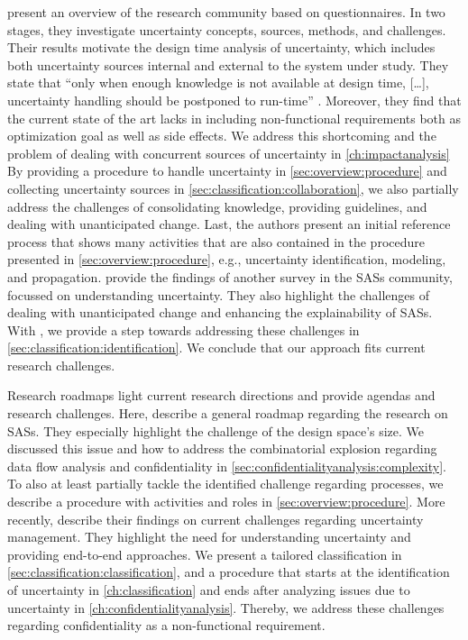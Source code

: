 \textcite{hezavehi_uncertainty_2021} present an overview of the research community based on questionnaires.
In two stages, they investigate uncertainty concepts, sources, methods, and challenges.
Their results motivate the design time analysis of uncertainty, which includes both uncertainty sources internal and external to the system under study.
They state that \enquote{only when enough knowledge is not available at design time, [\dots], uncertainty handling should be postponed to run-time} \cite{hezavehi_uncertainty_2021}.
Moreover, they find that the current state of the art lacks in including non-functional requirements both as optimization goal as well as side effects.
We address this shortcoming and the problem of dealing with concurrent sources of uncertainty in \autoref{ch:impactanalysis}
By providing a procedure to handle uncertainty in \autoref{sec:overview:procedure} and collecting uncertainty sources in \autoref{sec:classification:collaboration}, we also partially address the challenges of consolidating knowledge, providing guidelines, and dealing with unanticipated change.
Last, the authors present an initial reference process that shows many activities that are also contained in the procedure presented in \autoref{sec:overview:procedure}, e.g., uncertainty identification, modeling, and propagation.
\textcite{calinescu_understanding_2020} provide the findings of another survey in the \acp{SAS} community, focussed on understanding uncertainty.
They also highlight the challenges of dealing with unanticipated change and enhancing the explainability of \acp{SAS}.
With \arcen, we provide a step towards addressing these challenges in \autoref{sec:classification:identification}.
We conclude that our approach fits current research challenges.

Research roadmaps light current research directions and provide agendas and research challenges.
Here, \textcite{de_lemos_software_2013} describe a general roadmap regarding the research on \acp{SAS}.
They especially highlight the challenge of the design space's size.
We discussed this issue and how to address the combinatorial explosion regarding data flow analysis and confidentiality in \autoref{sec:confidentialityanalysis:complexity}.
To also at least partially tackle the identified challenge regarding processes, we describe a procedure with activities and roles in \autoref{sec:overview:procedure}.
More recently, \textcite{weyns_towards_2023} describe their findings on current challenges regarding uncertainty management.
They highlight the need for understanding uncertainty and providing end-to-end approaches.
We present a tailored classification in \autoref{sec:classification:classification}, and a procedure that starts at the identification of uncertainty in \autoref{ch:classification} and ends after analyzing issues due to uncertainty in \autoref{ch:confidentialityanalysis}.
Thereby, we address these challenges regarding confidentiality as a non-functional requirement.


